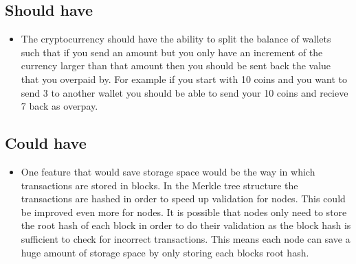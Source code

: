 \documentclass{l4proj}
\begin{document}
\subsection{Should have}
\begin{itemize}
    \item The cryptocurrency should have the ability to split the balance of wallets such that if you send an amount but you only
    have an increment of the currency larger than that amount then you should be sent back the value that you overpaid by.
    For example if you start with 10 coins and you want to send 3 to another wallet you should be able to send your 10 coins
    and recieve 7 back as overpay.    
\end{itemize}

\subsection{Could have}
\begin{itemize}
    \item One feature that would save storage space would be the way in which transactions are stored in blocks. In the Merkle tree
    structure the transactions are hashed in order to speed up validation for nodes. This could be improved even more for 
    nodes. It is possible that nodes only need to store the root hash of each block in order to do their validation as the
    block hash is sufficient to check for incorrect transactions. This means each node can save a huge amount of storage space
    by only storing each blocks root hash.
\end{itemize}
\end{document}
